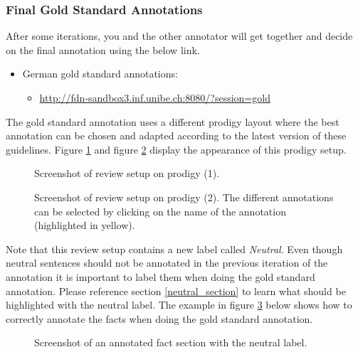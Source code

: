 \documentclass{article}
\begin{document}
\subsubsection{Final Gold Standard Annotations}\label{f_cycle}
After some iterations, you and the other annotator will get together and decide on the final annotation using the below link.
\begin{itemize}
\item German gold standard annotations:
\begin{itemize}
\item \href{http://fdn-sandbox3.inf.unibe.ch:8080/?session=gold}{http://fdn-sandbox3.inf.unibe.ch:8080/?session=gold}
\end{itemize}
\end{itemize}
The gold standard annotation uses a different prodigy layout where the best annotation can be chosen and adapted according to the latest version of these guidelines. Figure \ref{review_1} and figure \ref{review_2} display the appearance of this prodigy setup.

\begin{figure}[H]
     \caption{Screenshot of review setup on prodigy (1).}
     \label{review_1}
\end{figure}
\begin{figure}[H]
     \caption{Screenshot of review setup on prodigy (2). The different annotations can be selected by clicking on the name of the annotation (highlighted in yellow).}
     \label{review_2}
\end{figure}

Note that this review setup contains a new label called \emph{Neutral}. Even though neutral sentences should not be annotated in the previous iteration of the annotation it is important to label them when doing the gold standard annotation. Please reference section \ref{neutral_section} to learn what should be highlighted with the neutral label. The example in figure \ref{neutral_label} below shows how to correctly annotate the facts when doing the gold standard annotation.

\begin{figure}[H]
     \caption{Screenshot of an annotated fact section with the neutral label.}
     \label{neutral_label}
\end{figure}
\end{document}
